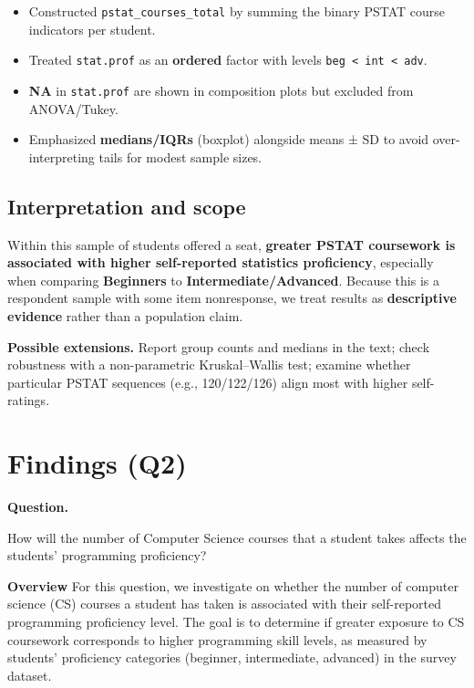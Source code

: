 \documentclass[
  letterpaper,
  DIV=11,
  numbers=noendperiod]{scrartcl}
\providecommand{\tightlist}{%
  \setlength{\itemsep}{0pt}\setlength{\parskip}{0pt}}\usepackage{longtable,booktabs,array}
\begin{document}
\begin{itemize}
\tightlist
\item
  Constructed \texttt{pstat\_courses\_total} by summing the binary PSTAT
  course indicators per student.\\
\item
  Treated \texttt{stat.prof} as an \textbf{ordered} factor with levels
  \texttt{beg\ \textless{}\ int\ \textless{}\ adv}.\\
\item
  \textbf{NA} in \texttt{stat.prof} are shown in composition plots but
  excluded from ANOVA/Tukey.\\
\item
  Emphasized \textbf{medians/IQRs} (boxplot) alongside means ± SD to
  avoid over-interpreting tails for modest sample sizes.
\end{itemize}

\subsection{Interpretation and scope}\label{interpretation-and-scope}

Within this sample of students offered a seat, \textbf{greater PSTAT
coursework is associated with higher self-reported statistics
proficiency}, especially when comparing \textbf{Beginners} to
\textbf{Intermediate/Advanced}. Because this is a respondent sample with
some item nonresponse, we treat results as \textbf{descriptive evidence}
rather than a population claim.

\textbf{Possible extensions.} Report group counts and medians in the
text; check robustness with a non-parametric Kruskal--Wallis test;
examine whether particular PSTAT sequences (e.g., 120/122/126) align
most with higher self-ratings.

\section{Findings (Q2)}\label{findings-q2}

\textbf{Question.}

How will the number of Computer Science courses that a student takes
affects the students' programming proficiency?

\textbf{Overview} For this question, we investigate on whether the
number of computer science (CS) courses a student has taken is
associated with their self-reported programming proficiency level. The
goal is to determine if greater exposure to CS coursework corresponds to
higher programming skill levels, as measured by students' proficiency
categories (beginner, intermediate, advanced) in the survey dataset.
\end{document}
